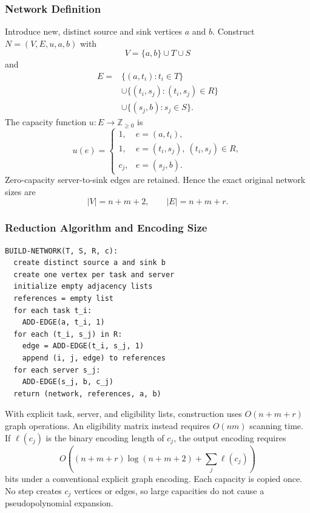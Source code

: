 \documentclass[conference]{IEEEtran}
\theoremstyle{definition}
\theoremstyle{remark}
\begin{document}
\subsubsection{Network Definition}
Introduce new, distinct source and sink vertices $a$ and $b$. Construct
$N=(V,E,u,a,b)$ with
\begin{equation}
V=\{a,b\}\cup T\cup S
\end{equation}
and
\begin{align}
E={}&\{(a,t_i):t_i\in T\}\nonumber\\
 &\cup\{(t_i,s_j):(t_i,s_j)\in R\}\nonumber\\
 &\cup\{(s_j,b):s_j\in S\}.
\end{align}
The capacity function $u:E\to\mathbb{Z}_{\geq0}$ is
\begin{equation}
u(e)=\begin{cases}
1,&e=(a,t_i),\\
1,&e=(t_i,s_j),\ (t_i,s_j)\in R,\\
c_j,&e=(s_j,b).
\end{cases}
\end{equation}
Zero-capacity server-to-sink edges are retained. Hence the exact original
network sizes are
\begin{equation}
|V|=n+m+2,\qquad |E|=n+m+r.
\label{eq:size}
\end{equation}

\subsubsection{Reduction Algorithm and Encoding Size}
\leavevmode\par
\begin{lstlisting}[caption={Reduction: network construction only.},label={lst:reduce}]
BUILD-NETWORK(T, S, R, c):
  create distinct source a and sink b
  create one vertex per task and server
  initialize empty adjacency lists
  references = empty list
  for each task t_i:
    ADD-EDGE(a, t_i, 1)
  for each (t_i, s_j) in R:
    edge = ADD-EDGE(t_i, s_j, 1)
    append (i, j, edge) to references
  for each server s_j:
    ADD-EDGE(s_j, b, c_j)
  return (network, references, a, b)
\end{lstlisting}

With explicit task, server, and eligibility lists, construction uses
$O(n+m+r)$ graph operations. An eligibility matrix instead requires
$O(nm)$ scanning time. If $\ell(c_j)$ is the binary encoding length of $c_j$,
the output encoding requires
\begin{equation}
O\!\left((n+m+r)\log(n+m+2)+\sum_j\ell(c_j)\right)
\end{equation}
bits under a conventional explicit graph encoding. Each capacity is copied
once. No step creates $c_j$ vertices or edges, so large capacities do not
cause a pseudopolynomial expansion.
\end{document}

